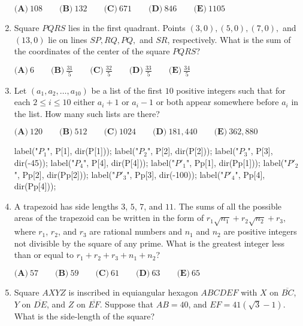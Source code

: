 \documentclass{article}
\begin{document}
\begin{enumerate}[label=\arabic*., itemsep=0.5em]
\(\textbf{(A)}\ 108\qquad\textbf{(B)}\ 132\qquad\textbf{(C)}\ 671\qquad\textbf{(D)}\ 846\qquad\textbf{(E)}\ 1105 \)\par \vspace{0.5em}\item Square \(PQRS\) lies in the first quadrant. Points \((3,0), (5,0), (7,0),\) and \((13,0)\) lie on lines \(SP, RQ, PQ,\) and \(SR\), respectively. What is the sum of the coordinates of the center of the square \(PQRS\)?

\(\textbf{(A)}\ 6\qquad\textbf{(B)}\ \frac{31}{5}\qquad\textbf{(C)}\ \frac{32}{5}\qquad\textbf{(D)}\ \frac{33}{5}\qquad\textbf{(E)}\ \frac{34}{5} \)\par \vspace{0.5em}\item Let \((a_1,a_2, \dots ,a_{10})\) be a list of the first \(10\) positive integers such that for each \(2 \le i \le 10\) either \(a_i+1\) or \(a_i-1\) or both appear somewhere before \(a_i\) in the list. How many such lists are there?

\(\textbf{(A)}\ 120\qquad\textbf{(B)}\ 512\qquad\textbf{(C)}\ 1024\qquad\textbf{(D)}\ 181,440\qquad\textbf{(E)}\ 362,880\)


label("$P_1$", P[1], dir(P[1]));
label("$P_2$", P[2], dir(P[2]));
label("$P_3$", P[3], dir(-45));
label("$P_4$", P[4], dir(P[4]));
label("$P'_1$", Pp[1], dir(Pp[1]));
label("$P'_2$", Pp[2], dir(Pp[2]));
label("$P'_3$", Pp[3], dir(-100));
label("$P'_4$", Pp[4], dir(Pp[4]));\par \vspace{0.5em}\item A trapezoid has side lengths \(3\), \(5\), \(7\), and \(11\). The sums of all the possible areas of the trapezoid can be written in the form of \(r_1\sqrt{n_1}+r_2\sqrt{n_2}+r_3\), where \(r_1\), \(r_2\), and \(r_3\) are rational numbers and \(n_1\) and \(n_2\) are positive integers not divisible by the square of any prime. What is the greatest integer less than or equal to \(r_1+r_2+r_3+n_1+n_2\)?

\(\textbf{(A)}\ 57\qquad\textbf{(B)}\ 59\qquad\textbf{(C)}\ 61\qquad\textbf{(D)}\ 63\qquad\textbf{(E)}\ 65\)\par \vspace{0.5em}\item Square \(AXYZ\) is inscribed in equiangular hexagon \(ABCDEF\) with \(X\) on \(\overline{BC}\), \(Y\) on \(\overline{DE}\), and \(Z\) on \(\overline{EF}\). Suppose that \(AB=40\), and \(EF=41(\sqrt{3}-1)\). What is the side-length of the square?



\end{enumerate}
\end{document}
